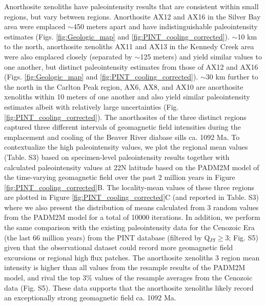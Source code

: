 \documentclass[9pt,twocolumn,twoside,lineno]{pnas-new}
\begin{document}
Anorthosite xenoliths have paleointensity results that are consistent within small regions, but vary between regions. Anorthosite AX12 and AX16 in the Silver Bay area were emplaced $\sim$450 meters apart and have indistinguishable paleointensity estimates (Figs. \ref{fig:Geologic_map} and \ref{fig:PINT_cooling_corrected}). $\sim$10 km to the north, anorthosite xenoliths AX11 and AX13 in the Kennedy Creek area were also emplaced closely (separated by $\sim$125 meters) and yield similar values to one another, but distinct paleointensity estimates from those of AX12 and AX16 (Figs. \ref{fig:Geologic_map} and \ref{fig:PINT_cooling_corrected}). $\sim$30 km further to the north in the Carlton Peak region, AX6, AX8, and AX10 are anorthosite xenoliths within 10 meters of one another and also yield similar paleointensity estimates albeit with relatively large uncertainties (Fig. \ref{fig:PINT_cooling_corrected}). The anorthosites of the three distinct regions captured three different intervals of geomagnetic field intensities during the emplacement and cooling of the Beaver River diabase sills ca. 1092 Ma. To contextualize the high paleointensity values, we plot the regional mean values (Table. S3) based on specimen-level paleointensity results together with calculated paleointensity values at 22\textdegree N latitude based on the PADM2M model of the time-varying geomagnetic field over the past 2 million years \cite{Ziegler2011a} in Figure \ref{fig:PINT_cooling_corrected}B. The locality-mean values of these three regions are plotted in Figure \ref{fig:PINT_cooling_corrected}C (and reported in Table. S3) where we also present the distribution of means calculated from 3 random values from the PADM2M model for a total of 10000 iterations. In addition, we perform the same comparison with the existing paleointensity data for the Cenozoic Era (the last 66 million years) from the PINT database (filtered by Q$_{PI}\geq$3; Fig. S5) given that the observational dataset could record more geomagnetic field excursions or regional high flux patches. The anorthosite xenoliths 3 region mean intensity is higher than all values from the resample results of the PADM2M model, and rival the top 3\% values of the resample averages from the Cenozoic data (Fig. S5). These data supports that the anorthosite xenoliths likely record an exceptionally strong geomagnetic field ca. 1092 Ma.
\end{document}
